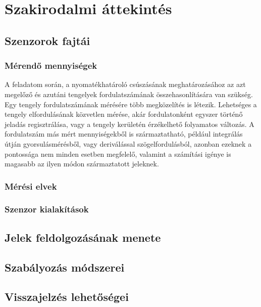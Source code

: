 \chapter{Szakirodalmi áttekintés}
\label{sec:Szakirodalom}
\section{Szenzorok fajtái}



\subsection{Mérendő mennyiségek}

A feladatom során, a nyomatékhatároló csúszásának meghatározásához az azt megelőző és azutáni tengelyek fordulatszámának összehasonlítására van szükség. Egy tengely fordulatszámának mérésére több megközelítés is létezik. Lehetséges a tengely elfordulásának közvetlen mérése, akár fordulatonként egyszer történő jeladás regisztrálása, vagy a tengely kerületén érzékelhető folyamatos változás. A fordulatszám más mért mennyiségekből is származtatható, például integrálás útján gyorsulásmérésből, vagy deriválással szögelfordulásból, azonban ezeknek a pontossága nem minden esetben megfelelő, valamint a számítási igénye is magasabb az ilyen módon származtatott jeleknek.

\subsection{Mérési elvek}

\subsection{Szenzor kialakítások}
\section{Jelek feldolgozásának menete}

\section{Szabályozás módszerei}

\section{Visszajelzés lehetőségei}
